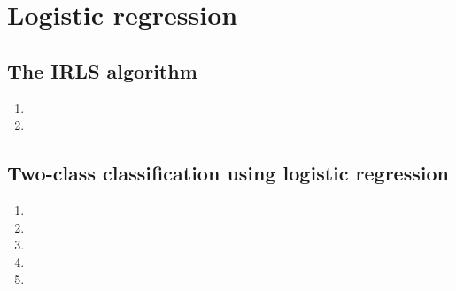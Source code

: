 \documentclass[paper=a4, fontsize=10pt]{scrartcl} %
\numberwithin{equation}{section} %
\numberwithin{figure}{section} %
\numberwithin{table}{section} %
\begin{document}
\section{Logistic regression}
\subsection{The IRLS algorithm}
\begin{enumerate}
	\item 
	\item
\end{enumerate}

\subsection{Two-class classification using logistic regression}
\begin{enumerate}
	\item 
	\item
	\item
	\item
	\item
\end{enumerate}
\end{document}
